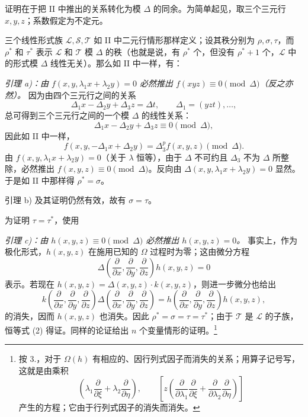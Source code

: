 证明在于把 II 中推出的关系转化为模 $\Delta$ 的同余。为简单起见，取三个三元行 $x,y,z$；系数假定为不定元。

三个线性形式族 $\mathcal L,\mathcal S,\mathcal T$ 如 II 中二元行情形那样定义；设其秩分别为 $\rho,\sigma,\tau$，而 $\rho^*$ 和 $\tau^*$ 表示 $\mathcal L$ 和 $\mathcal T$ 模 $\Delta$ 的秩（也就是说，有 $\rho^*$ 个，但没有 $\rho^*+1$ 个，$\mathcal L$ 中的形式模 $\Delta$ 线性无关）。那么如 II 中一样，有：

\emph{引理 a)：由 $f(x,y,\lambda_1x+\lambda_2y)=0$ 必然推出 $f(xyz)\equiv0\pmod{\Delta}$（反之亦然）。} 因为由四个三元行之间的关系
\[
  \Delta_1x-\Delta_2y+\Delta_3z=\Delta t,
  \qquad \Delta_1=(yzt),\ldots,
\]
总可得到三个三元行之间的一个模 $\Delta$ 的线性关系：
\[
  \Delta_1x-\Delta_2y+\Delta_3z\equiv0\pmod{\Delta},
\]
因此如 II 中一样，
\[
  f(x,y,-\Delta_1x+\Delta_2y)=\Delta_3^p f(x,y,z)\pmod{\Delta}.
\]
由 $f(x,y,\lambda_1x+\lambda_2y)=0$（关于 $\lambda$ 恒等），由于 $\Delta$ 不可约且 $\Delta_3$ 不为 $\Delta$ 所整除，必然推出 $f(x,y,z)\equiv0\pmod{\Delta}$。反向由 $\Delta(x,y,\lambda_1x+\lambda_2y)=0$ 显然。于是如 II 中那样得 $\rho^*=\sigma$。

引理 b) 及其证明仍然有效，故有 $\sigma=\tau$。

为证明 $\tau=\tau^*$，使用

\emph{引理 c)：由 $h(x,y,z)\equiv0\pmod{\Delta}$ 必然推出 $h(x,y,z)=0$。} 事实上，作为极化形式，$h(x,y,z)$ 在施用已知的 $\Omega$ 过程时为零；这由微分方程
\[
  \Delta\!\left(\frac{\partial}{\partial x},\frac{\partial}{\partial y},\frac{\partial}{\partial z}\right)h(x,y,z)=0
\]
表示。若现在 $h(x,y,z)=\Delta(x,y,z)\cdot k(x,y,z)$，则进一步微分也给出
\[
  k\!\left(\frac{\partial}{\partial x},\frac{\partial}{\partial y},\frac{\partial}{\partial z}\right)
  \Delta\!\left(\frac{\partial}{\partial x},\frac{\partial}{\partial y},\frac{\partial}{\partial z}\right)
  =
  h\!\left(\frac{\partial}{\partial x},\frac{\partial}{\partial y},\frac{\partial}{\partial z}\right)h(x,y,z),
\]
的消失，因而 $h(x,y,z)$ 也消失。因此 $\rho^*=\sigma=\tau=\tau^*$；由于 $\mathcal T$ 是 $\mathcal L$ 的子族，恒等式 (2) 得证。同样的论证给出 $n$ 个变量情形的证明。\footnote{按 3.，对于 $\Omega(h)$ 有相应的、因行列式因子而消失的关系；用算子记号写，这就是由乘积
\[
 \left(\lambda_1\frac{\partial}{\partial \xi}+\lambda_2\frac{\partial}{\partial \eta}\right),
 \qquad
 \left[z\left(\frac{\partial}{\partial\lambda_1}\frac{\partial}{\partial \xi}
 +\frac{\partial}{\partial\lambda_2}\frac{\partial}{\partial \eta}\right)\right]
\]
产生的方程；它由于行列式因子的消失而消失。}


